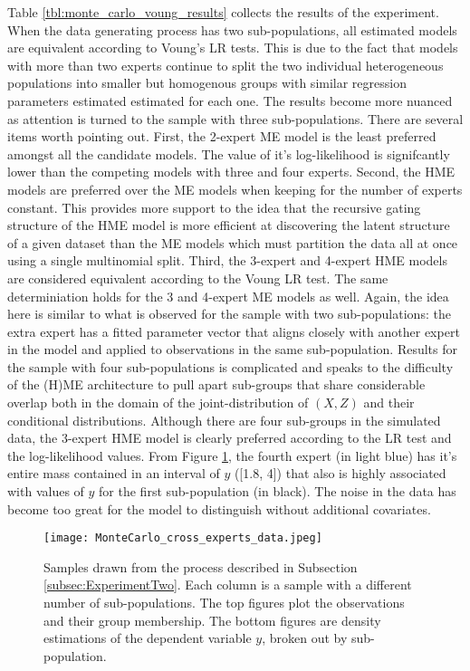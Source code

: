 \documentclass[12pt]{article}
\theoremstyle{definition}
\begin{document}
Table \ref{tbl:monte_carlo_voung_results} collects the results of the experiment. When the data generating process has two sub-populations, all estimated models are equivalent according to Voung's LR tests. This is due to the fact that models with more than two experts continue to split the two individual heterogeneous populations into smaller but homogenous groups with similar regression parameters estimated estimated for each one. The results become more nuanced as attention is turned to the sample with three sub-populations. There are several items worth pointing out. First, the 2-expert ME model is the least preferred amongst all the candidate models. The value of it's log-likelihood is signifcantly lower than the competing models with three and four experts. Second, the HME models are preferred over the ME models when keeping for the number of experts constant. This provides more support to the idea that the recursive gating structure of the HME model is more efficient at discovering the latent structure of a given dataset than the ME models which must partition the data all at once using a single multinomial split. Third, the 3-expert and 4-expert HME models are considered equivalent according to the Voung LR test. The same determiniation holds for the 3 and 4-expert ME models as well. Again, the idea here is similar to what is observed for the sample with two sub-populations: the extra expert has a fitted parameter vector that aligns closely with another expert in the model and applied to observations in the same sub-population. Results for the sample with four sub-populations is complicated and speaks to the difficulty of the (H)ME architecture to pull apart sub-groups that share considerable overlap both in the domain of the joint-distribution of $(X, Z)$ and their conditional distributions. Although there are four sub-groups in the simulated data, the 3-expert HME model is clearly preferred according to the LR test and the log-likelihood values. From Figure \ref{fig:MonteCarlo_cross_experts}, the fourth expert (in light blue) has it's entire mass contained in an interval of $y$ ([1.8, 4]) that also is highly associated with values of $y$ for the first sub-population (in black). The noise in the data has become too great for the model to distinguish without additional covariates.

\begin{figure}[t!]
  \texttt{[image: MonteCarlo\_cross\_experts\_data.jpeg]}
  \caption{Samples drawn from the process described in Subsection \ref{subsec:ExperimentTwo}. Each column is a sample with a different number of sub-populations. The top figures plot the observations and their group membership. The bottom figures are density estimations of the dependent variable $y$, broken out by sub-population.}
  \label{fig:MonteCarlo_cross_experts}
\end{figure}
\end{document}
